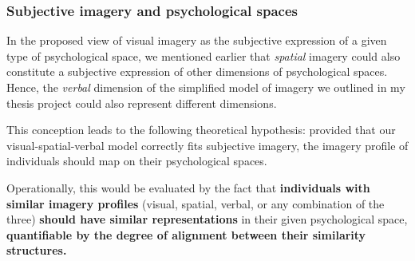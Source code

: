 \documentclass[
  authoryear]{elsarticle}
\begin{document}
\subsubsection{Subjective imagery and psychological
spaces}\label{subjective-imagery-and-psychological-spaces}

In the proposed view of visual imagery as the subjective expression of a
given type of psychological space, we mentioned earlier that
\emph{spatial} imagery could also constitute a subjective expression of
other dimensions of psychological spaces. Hence, the \emph{verbal}
dimension of the simplified model of imagery we outlined in my thesis
project could also represent different dimensions.

This conception leads to the following theoretical hypothesis: provided
that our visual-spatial-verbal model correctly fits subjective imagery,
the imagery profile of individuals should map on their psychological
spaces.

Operationally, this would be evaluated by the fact that
\textbf{individuals with similar imagery profiles} (visual, spatial,
verbal, or any combination of the three) \textbf{should have similar
representations} in their given psychological space,
\textbf{quantifiable by the degree of alignment between their similarity
structures.}
\end{document}
